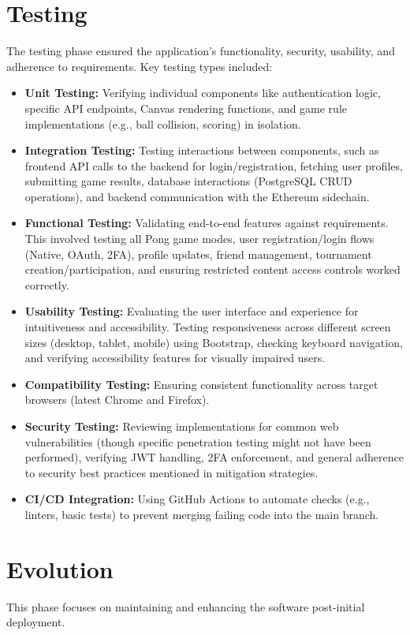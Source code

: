 \section{Testing}
The testing phase ensured the application's functionality, security, usability, and adherence to requirements. Key testing types included:
\begin{itemize}
    \item \textbf{Unit Testing:} Verifying individual components like authentication logic, specific API endpoints, Canvas rendering functions, and game rule implementations (e.g., ball collision, scoring) in isolation.
    \item \textbf{Integration Testing:} Testing interactions between components, such as frontend API calls to the backend for login/registration, fetching user profiles, submitting game results, database interactions (PostgreSQL CRUD operations), and backend communication with the Ethereum sidechain.
    \item \textbf{Functional Testing:} Validating end-to-end features against requirements. This involved testing all Pong game modes, user registration/login flows (Native, OAuth, 2FA), profile updates, friend management, tournament creation/participation, and ensuring restricted content access controls worked correctly.
    \item \textbf{Usability Testing:} Evaluating the user interface and experience for intuitiveness and accessibility. Testing responsiveness across different screen sizes (desktop, tablet, mobile) using Bootstrap, checking keyboard navigation, and verifying accessibility features for visually impaired users.
    \item \textbf{Compatibility Testing:} Ensuring consistent functionality across target browsers (latest Chrome and Firefox).
    \item \textbf{Security Testing:} Reviewing implementations for common web vulnerabilities (though specific penetration testing might not have been performed), verifying JWT handling, 2FA enforcement, and general adherence to security best practices mentioned in mitigation strategies.
    \item \textbf{CI/CD Integration:} Using GitHub Actions to automate checks (e.g., linters, basic tests) to prevent merging failing code into the main branch.
\end{itemize}

\section{Evolution}
This phase focuses on maintaining and enhancing the software post-initial deployment.
